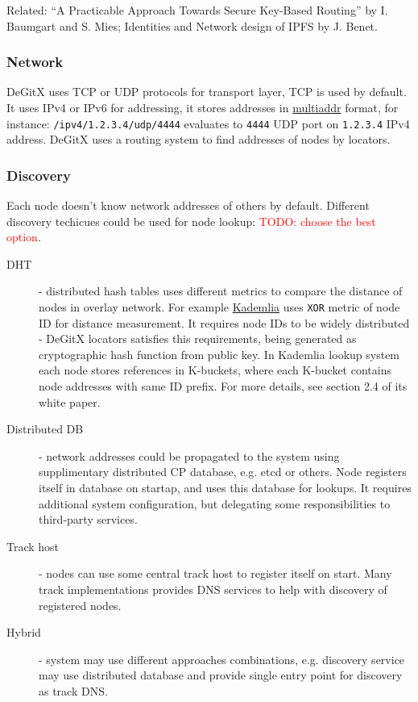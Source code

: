 \documentclass[12pt,oneside]{article}
\newcommand{\code}[1]{\texttt{#1}}
\newcommand{\todo}[1]{\textcolor{red}{TODO: #1}}
\begin{document}
Related: ``A Practicable Approach Towards Secure Key-Based Routing'' by I. Baumgart and S. Mies;
Identities and Network design of IPFS by J. Benet.

\subsubsection{Network}
DeGitX uses TCP or UDP protocols for transport layer, TCP is used by default. It uses IPv4 or IPv6 for addressing,
it stores addresses in \href{https://github.com/multiformats/multiaddr}{multiaddr} format, for instance:
\code{/ipv4/1.2.3.4/udp/4444} evaluates to \code{4444} UDP port on \code{1.2.3.4} IPv4 address.
DeGitX uses a routing system to find addresses of nodes by locators.

\subsubsection{Discovery}
\label{sec:discovery}
Each node doesn't know network addresses of others by default. Different discovery techicues could be used
for node lookup:
\todo{choose the best option}.
\begin{description}
\item[DHT] - distributed hash tables uses different metrics to compare the distance of nodes in overlay network.
  For example \href{pdos.csail.mit.edu/~petar/papers/maymounkov-kademlia-lncs.pdf}{Kademlia} uses
  \code{XOR} metric of node ID for distance measurement. It requires node IDs to be widely distributed -
  DeGitX locators satisfies this requirements, being generated as cryptographic hash function from
  public key. In Kademlia lookup system each node stores references in K-buckets, where each K-bucket
  contains node addresses with same ID prefix. For more details, see section 2.4 of its white paper.
\item[Distributed DB] - network addresses could be propagated to the system using supplimentary distributed
  CP database, e.g. etcd or others. Node registers itself in database on startap, and uses this database for lookups.
  It requires additional system configuration, but delegating some responsibilities to third-party services.
\item[Track host] - nodes can use some central track host to register itself on start. Many track implementations
  provides DNS services to help with discovery of registered nodes.
\item[Hybrid] - system may use different approaches combinations, e.g. discovery service may use distributed database
  and provide single entry point for discovery as track DNS.
\end{description}
\end{document}
